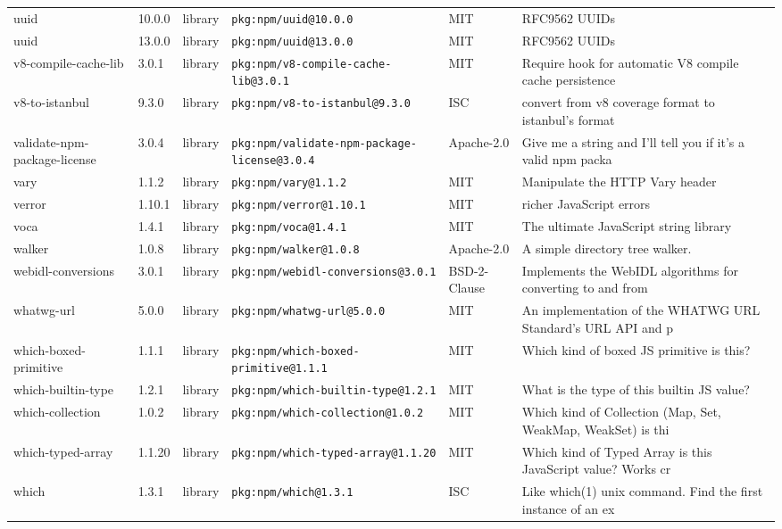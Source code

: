 \documentclass[11pt]{article}
\begin{document}
\begin{longtable}{|l|l|l|p{2.2cm}|l|p{4cm}|}
uuid & 10.0.0 & library & \texttt{pkg:npm/uuid@10.0.0} & MIT & RFC9562 UUIDs \\
uuid & 13.0.0 & library & \texttt{pkg:npm/uuid@13.0.0} & MIT & RFC9562 UUIDs \\
v8-compile-cache-lib & 3.0.1 & library & \texttt{pkg:npm/v8-compile-cache-lib@3.0.1} & MIT & Require hook for automatic V8 compile cache persistence \\
v8-to-istanbul & 9.3.0 & library & \texttt{pkg:npm/v8-to-istanbul@9.3.0} & ISC & convert from v8 coverage format to istanbul's format \\
validate-npm-package-license & 3.0.4 & library & \texttt{pkg:npm/validate-npm-package-license@3.0.4} & Apache-2.0 & Give me a string and I'll tell you if it's a valid npm packa \\
vary & 1.1.2 & library & \texttt{pkg:npm/vary@1.1.2} & MIT & Manipulate the HTTP Vary header \\
verror & 1.10.1 & library & \texttt{pkg:npm/verror@1.10.1} & MIT & richer JavaScript errors \\
voca & 1.4.1 & library & \texttt{pkg:npm/voca@1.4.1} & MIT & The ultimate JavaScript string library \\
walker & 1.0.8 & library & \texttt{pkg:npm/walker@1.0.8} & Apache-2.0 & A simple directory tree walker. \\
webidl-conversions & 3.0.1 & library & \texttt{pkg:npm/webidl-conversions@3.0.1} & BSD-2-Clause & Implements the WebIDL algorithms for converting to and from  \\
whatwg-url & 5.0.0 & library & \texttt{pkg:npm/whatwg-url@5.0.0} & MIT & An implementation of the WHATWG URL Standard's URL API and p \\
which-boxed-primitive & 1.1.1 & library & \texttt{pkg:npm/which-boxed-primitive@1.1.1} & MIT & Which kind of boxed JS primitive is this? \\
which-builtin-type & 1.2.1 & library & \texttt{pkg:npm/which-builtin-type@1.2.1} & MIT & What is the type of this builtin JS value? \\
which-collection & 1.0.2 & library & \texttt{pkg:npm/which-collection@1.0.2} & MIT & Which kind of Collection (Map, Set, WeakMap, WeakSet) is thi \\
which-typed-array & 1.1.20 & library & \texttt{pkg:npm/which-typed-array@1.1.20} & MIT & Which kind of Typed Array is this JavaScript value? Works cr \\
which & 1.3.1 & library & \texttt{pkg:npm/which@1.3.1} & ISC & Like which(1) unix command. Find the first instance of an ex \\

\end{longtable}
\end{document}
